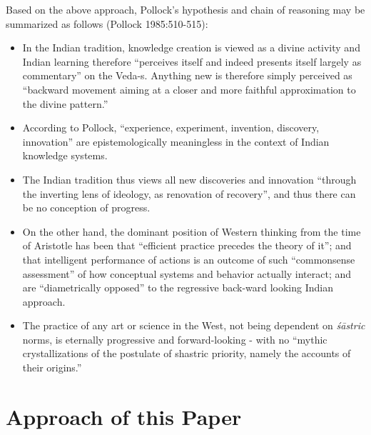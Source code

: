 Based on the above approach, Pollock's hypothesis and chain of reasoning may be summarized as follows (Pollock 1985:510-515): 
\begin{itemize}
\item In the Indian tradition, knowledge creation is viewed as a divine activity and Indian learning therefore ``perceives itself and indeed presents itself largely as commentary'' on the \hbox{Veda-s}. Anything new is therefore simply perceived as ``backward movement aiming at a closer and more faithful approximation to the divine pattern.''

\newpage

\item According to Pollock, ``experience, experiment, invention, discovery, innovation'' are epistemologically meaningless in the context of Indian knowledge systems.

\item The Indian tradition thus views all new discoveries and innovation ``through the inverting lens of ideology, as renovation of recovery'', and thus there can be no conception of progress.

\item On the other hand, the dominant position of Western thinking from the time of Aristotle has been that ``efficient practice precedes the theory of it''; and that intelligent performance of actions is an outcome of such ``commonsense assessment'' of how conceptual systems and behavior actually interact; and are ``diametrically opposed'' to the regressive back-ward looking Indian approach. 

\item The practice of any art or science in the West, not being dependent on {\sl śāstric} norms, is eternally progressive and forward-looking - with no ``mythic crystallizations of the postulate of shastric priority, namely the accounts of their origins.''
\end{itemize}

\section*{Approach of this Paper}

